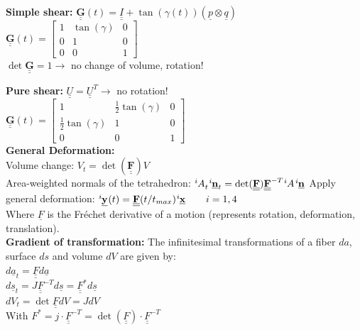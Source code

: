 \textbf{Simple shear:} $\underline{\underline{\mathbf{G}}}(t) = \underline{\underline{I}} + \tan{(\gamma (t))} (\underline{p} \otimes \underline{q})$ \\
$ \underline{\underline{\mathbf{G}}}(t) = \left[\begin{array}{ccc}1 & \tan (\gamma) & 0 \\0 & 1 & 0 \\0 & 0 & 1\end{array}\right]$ \\
$ \det{\underline{\underline{\mathbf{G}}}} = 1 \rightarrow $ no change of volume, rotation!

\textbf{Pure shear:} $\underline{\underline{U}} = \underline{\underline{U}}^T \rightarrow $ no rotation! \\
$ \underline{\underline{\mathbf{G}}}(t) = \left[\begin{array}{ccc}1 & \frac{1}{2} \tan (\gamma) & 0 \\ \frac{1}{2} \tan (\gamma) & 1 & 0 \\0 & 0 & 1\end{array}\right]$ \\

\textbf{General Deformation:} \\
Volume change: $V_t = \operatorname{det}(\underline{\underline{\mathbf{F}}}) V $ \\
Area-weighted normals of the tetrahedron: 
$\tensor[^i]{A}{_t} \tensor[^i]{\underline{\mathbf{n}}}{_t} = \operatorname{det}(\underline{\underline{\mathbf{F}}}) \tensor[]{\underline{\underline{\mathbf{F}}}}{^{-T}} \tensor[^i]{A}{} \tensor[^i]{\underline{\mathbf{n}}}{}$
\smallskip
Apply general deformation: {$\tensor[^i]{\underline{\mathbf{y}}}{}(t) = \underline{\underline{\mathbf{F}}} (t/t_{max})\tensor[^i]{\underline{\mathbf{x}}}{} \qquad i = 1,4 $}\\
Where $\underline{F}$ is the Fréchet derivative of a motion (represents rotation, deformation, translation). \\

\textbf{Gradient of transformation:} The infinitesimal transformations of a fiber $da$, surface $ds$ and volume $dV$ are given by: \\

$ d \underline{a}_t = \underline{\underline{F}} d \underline{a} $ \\
$ d \underline{s}_t = J \underline{\underline{F}} ^{-T} d \underline{s} = \underline{\underline{F}}^* d \underline{s}$ \\
$ d V_t = \det{\underline{\underline{F}}} dV = JdV $ \\
With $F^* = j \cdot \underline{\underline{F}} ^{-T} =  \det({\underline{\underline{F}}}) \cdot \underline{\underline{F}} ^{-T}$ \\

